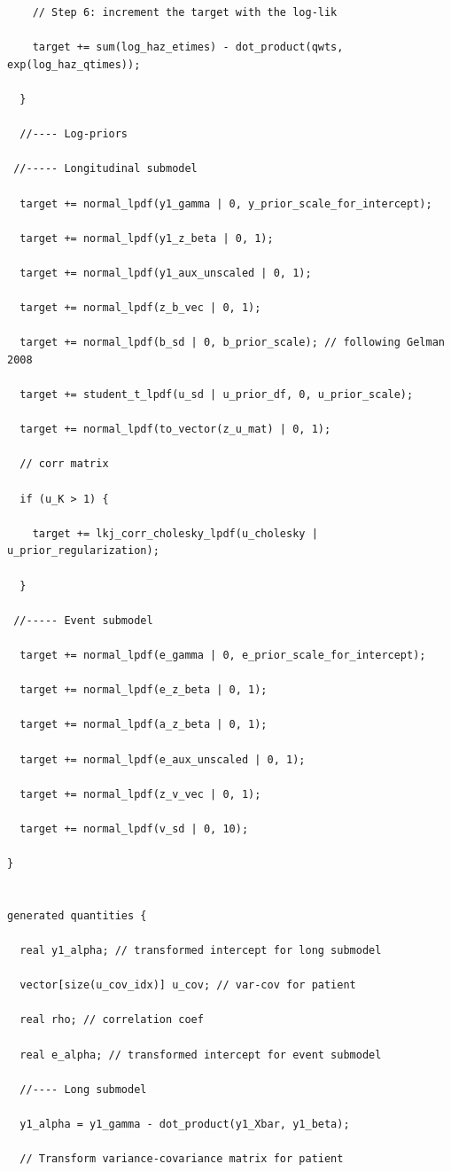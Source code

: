 \begin{SingleSpace}
\begin{verbatim}
    // Step 6: increment the target with the log-lik

    target += sum(log_haz_etimes) - dot_product(qwts, exp(log_haz_qtimes));

  }

  //---- Log-priors

 //----- Longitudinal submodel

  target += normal_lpdf(y1_gamma | 0, y_prior_scale_for_intercept);

  target += normal_lpdf(y1_z_beta | 0, 1);

  target += normal_lpdf(y1_aux_unscaled | 0, 1);

  target += normal_lpdf(z_b_vec | 0, 1);

  target += normal_lpdf(b_sd | 0, b_prior_scale); // following Gelman 2008

  target += student_t_lpdf(u_sd | u_prior_df, 0, u_prior_scale);

  target += normal_lpdf(to_vector(z_u_mat) | 0, 1);

  // corr matrix

  if (u_K > 1) {

    target += lkj_corr_cholesky_lpdf(u_cholesky | u_prior_regularization);

  }

 //----- Event submodel
 
  target += normal_lpdf(e_gamma | 0, e_prior_scale_for_intercept);

  target += normal_lpdf(e_z_beta | 0, 1);

  target += normal_lpdf(a_z_beta | 0, 1);

  target += normal_lpdf(e_aux_unscaled | 0, 1);

  target += normal_lpdf(z_v_vec | 0, 1);

  target += normal_lpdf(v_sd | 0, 10);

}


generated quantities {

  real y1_alpha; // transformed intercept for long submodel

  vector[size(u_cov_idx)] u_cov; // var-cov for patient

  real rho; // correlation coef

  real e_alpha; // transformed intercept for event submodel
  
  //---- Long submodel

  y1_alpha = y1_gamma - dot_product(y1_Xbar, y1_beta);

  // Transform variance-covariance matrix for patient


\end{verbatim}
\end{SingleSpace}
